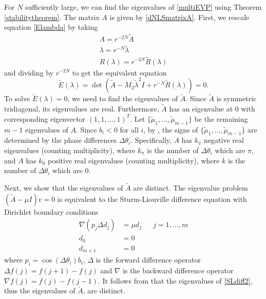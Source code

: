 \documentclass[12pt]{article}
\begin{document}
For $N$ sufficiently large, we can find the eigenvalues of \eqref{multiEVP} using Theorem \ref{stabilitytheorem}. The matrix $A$ is given by \eqref{dNLSmatrixA}. First, we rescale equation \eqref{Elambda} by taking
\begin{align*}
A = r^{-2N} \tilde{A} \\
\lambda = r^{-N} \tilde{\lambda} \\
R(\lambda) = r^{-3N} \tilde{R}(\lambda)
\end{align*}
and dividing by $r^{-2N}$ to get the equivalent equation
\begin{equation}\label{dNLStildeE}
\tilde{E}(\lambda) = 
\det(\tilde{A} - M_2 \tilde{\lambda}^2 I + r^{-N} \tilde{R}(\lambda)) = 0.
\end{equation}
To solve $\tilde{E}(\lambda) = 0$, we need to find the eigenvalues of $\tilde{A}$. Since $\tilde{A}$ is symmetric tridiagonal, its eigenvalues are real. Furthermore, $\tilde{A}$ has an eigenvalue at 0 with corresponding eigenvector $(1, 1, \dots, 1)^T$. Let $\{ \tilde{\mu}_1, \dots, \tilde{\mu}_{m-1}\}$ be the remaining $m-1$ eigenvalues of $A$. Since $b_i < 0$ for all $i$, by \cite[Lemma 5.4]{Sandstede1998}, the signs of $\{ \tilde{\mu}_1, \dots, \tilde{\mu}_{m-1}\}$ are determined by the phase differences $\Delta\theta_i$. Specifically, $A$ has $k_\pi$ negative real eigenvalues (counting multiplicity), where $k_\pi$ is the number of $\Delta\theta_i$ which are $\pi$, and $A$ has $k_0$ positive real eigenvalues (counting multiplicity), where $k$ is the number of $\Delta\theta_i$ which are $0$. 

Next, we show that the eigenvalues of $\tilde{A}$ are distinct. The eigenvalue problem $(\tilde{A} - \mu I)v = 0$ is equivalent to the Sturm-Liouville difference equation with Dirichlet boundary conditions
\begin{equation}\label{SLdiff2}
\begin{aligned}
\nabla( p_j \Delta d_j ) &= \mu d_j && j = 1, \dots, m \\
d_0 &= 0 \\
d_{m+1} &= 0
\end{aligned}
\end{equation}
where $p_i = \cos(\Delta\theta_i) b_i$, $\Delta$ is the forward difference operator $\Delta f(j) = f(j+1) - f(j)$ and $\nabla$ is the backward difference operator $\nabla f(j) = f(j) - f(j-1)$. It follows from \cite[Corollary 2.2.7]{Jirari1995} that the eigenvalues of \eqref{SLdiff2}, thus the eigenvalues of $\tilde{A}$, are distinct.
\end{document}
